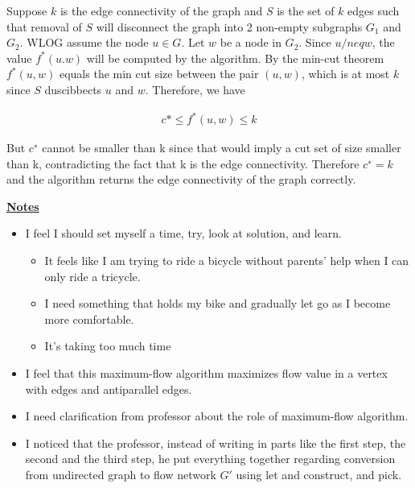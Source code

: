 \documentclass[12pt]{article}
\begin{document}
\begin{enumerate}[1.]
\begin{mdframed}
    \bigskip

    Suppose $k$ is the edge connectivity of the graph and $S$ is the set of $k$
    edges such that removal of $S$ will disconnect the graph into
    2 non-empty subgraphs $G_1$ and $G_2$. WLOG assume the node $u \in G$.
    Let $w$ be a node in $G_2$. Since $u /neq w$, the value $f^*(u.w)$ will be computed
    by the algorithm. By the min-cut theorem $f^*(u,w)$ equals the min cut size
    between the pair $(u,w)$, which is at most $k$ since $S$ duscibbects $u$ and $w$.
    Therefore, we have

    \begin{align}
        c* \leq f^*(u,w) \leq k
    \end{align}

    But $c^{∗}$ cannot be smaller than k since that would imply a cut set of size smaller than k,
    contradicting the fact that k is the edge connectivity. Therefore $c^{∗} = k$ and the algorithm
    returns the edge connectivity of the graph correctly.
    \end{mdframed}


    \bigskip

    \underline{\textbf{Notes}}

    \begin{itemize}
        \item I feel I should set myself a time, try, look at solution, and learn.

        \begin{itemize}
            \item It feels like I am trying to ride a bicycle without parents' help when I can only ride a tricycle.
            \item I need something that holds my bike and gradually let go as I become more comfortable.
            \item It's taking too much time
        \end{itemize}
        \item I feel that this maximum-flow algorithm maximizes flow value
        in a vertex with edges and antiparallel edges.
        \item I need clarification from professor about the role of maximum-flow algorithm.
        \item I noticed that the professor, instead of writing in parts like the first step, the second and the third step,
        he put everything together regarding conversion from undirected graph to flow network $G'$
        using let and construct, and pick.


\end{itemize}
\end{enumerate}
\end{document}
